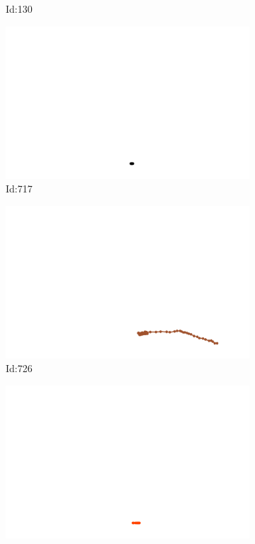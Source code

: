 \documentclass[12pt,twoside]{report}
\begin{document}
\begin{figure}
\begin{subfigure}[b]{0.20\textwidth}
\caption{Id:130}
\end{subfigure}
\begin{subfigure}[b]{0.20\textwidth}
\centering
\includegraphics[width=\textwidth]{../../trajectories/717.png}
\caption{Id:717}
\end{subfigure}
\begin{subfigure}[b]{0.20\textwidth}
\centering
\includegraphics[width=\textwidth]{../../trajectories/726.png}
\caption{Id:726}
\end{subfigure}
\begin{subfigure}[b]{0.20\textwidth}
\centering
\includegraphics[width=\textwidth]{../../trajectories/835.png}

\end{subfigure}
\end{figure}
\end{document}
